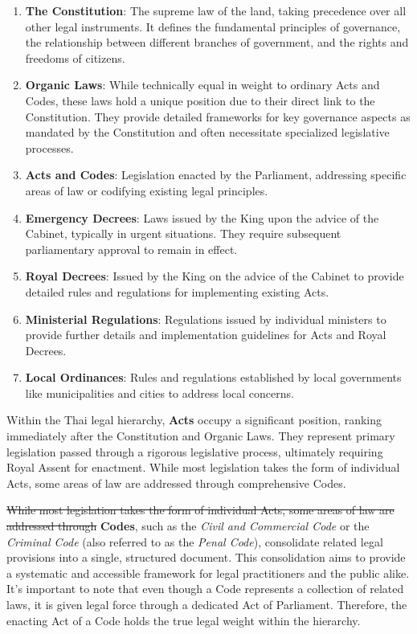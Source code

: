 \begin{enumerate}
    \item \textbf{The Constitution}: The supreme law of the land, taking precedence over all other legal instruments. It defines the fundamental principles of governance, the relationship between different branches of government, and the rights and freedoms of citizens.
    \item \textbf{Organic Laws}: While technically equal in weight to ordinary Acts and Codes, these laws hold a unique position due to their direct link to the Constitution. They provide detailed frameworks for key governance aspects as mandated by the Constitution and often necessitate specialized legislative processes.
    \item \textbf{Acts and Codes}: Legislation enacted by the Parliament, addressing specific areas of law or codifying existing legal principles.
    \item \textbf{Emergency Decrees}: Laws issued by the King upon the advice of the Cabinet, typically in urgent situations. They require subsequent parliamentary approval to remain in effect.
    \item \textbf{Royal Decrees}: Issued by the King on the advice of the Cabinet to provide detailed rules and regulations for implementing existing Acts.
    \item \textbf{Ministerial Regulations}: Regulations issued by individual ministers to provide further details and implementation guidelines for Acts and Royal Decrees.
    \item \textbf{Local Ordinances}: Rules and regulations established by local governments like municipalities and cities to address local concerns.
\end{enumerate}

Within the Thai legal hierarchy, \textbf{Acts} occupy a significant position, ranking immediately after the Constitution and Organic Laws. They represent primary legislation passed through a rigorous legislative process, ultimately requiring Royal Assent for enactment. While most legislation takes the form of individual Acts, some areas of law are addressed through comprehensive Codes.

\st{While most legislation takes the form of individual Acts, some areas of law are addressed through }\textbf{Codes}, such as the \textit{Civil and Commercial Code} or the \textit{Criminal Code} (also referred to as the \textit{Penal Code}), consolidate related legal provisions into a single, structured document. This consolidation aims to provide a systematic and accessible framework for legal practitioners and the public alike. It's important to note that even though a Code represents a collection of related laws, it is given legal force through a dedicated Act of Parliament. Therefore, the enacting Act of a Code holds the true legal weight within the hierarchy.


